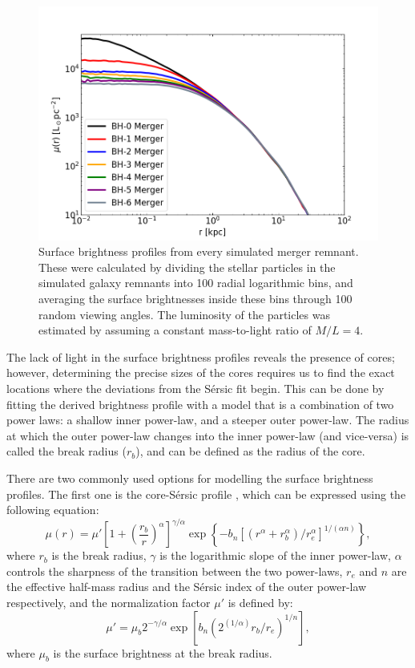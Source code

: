 \documentclass[english, oneside]{HYgradu}
\begin{document}
\begin{figure}[h]
	\centering
	\includegraphics[width=\textwidth]{SurfaceBrightnessProfiles.png}
	\caption{Surface brightness profiles from every simulated merger remnant. These were calculated by dividing the stellar particles in the simulated galaxy remnants into 100 radial logarithmic bins, and averaging the surface brightnesses inside these bins through 100 random viewing angles. The luminosity of the particles was estimated by assuming a constant mass-to-light ratio of $M/L = 4$.}
	\label{figure:surface_brightness}
\end{figure}

The lack of light in the surface brightness profiles reveals the presence of cores; however, determining the precise sizes of the cores requires us to find the exact locations where the deviations from the Sérsic fit begin. This can be done by fitting the derived brightness profile with a model that is a combination of two power laws: a shallow inner power-law, and a steeper outer power-law. The radius at which the outer power-law changes into the inner power-law (and vice-versa) is called the break radius ($r_b$), and can be defined as the radius of the core. 

There are two commonly used options for modelling the surface brightness profiles. The first one is the core-Sérsic profile \citep{Graham2003}, which can be expressed using the following equation:
\begin{equation}
\mu(r) = \mu' \left[ 1 + \left( \frac{r_b}{r} \right)^\alpha \right]^{\gamma / \alpha} \exp \left\lbrace -b_n \left[ \left( r^\alpha + r_b^\alpha \right) / r_e^\alpha \right]^{1/(\alpha n)} \right\rbrace, \label{eq:core-sersic}
\end{equation}
where $r_b$ is the break radius, $\gamma$ is the logarithmic slope of the inner power-law, $\alpha$ controls the sharpness of the transition between the two power-laws, $r_e$ and $n$ are the effective half-mass radius and the Sérsic index of the outer power-law respectively, and the normalization factor $\mu'$ is defined by:
\begin{equation}
\mu' = \mu_b 2^{-\gamma/\alpha} \exp \left[ b_n \left( 2^{(1/\alpha)} r_b/r_e \right)^{1/n} \right], 
\label{eq:mu_dot}
\end{equation}
where $\mu_b$ is the surface brightness at the break radius. 
\end{document}
